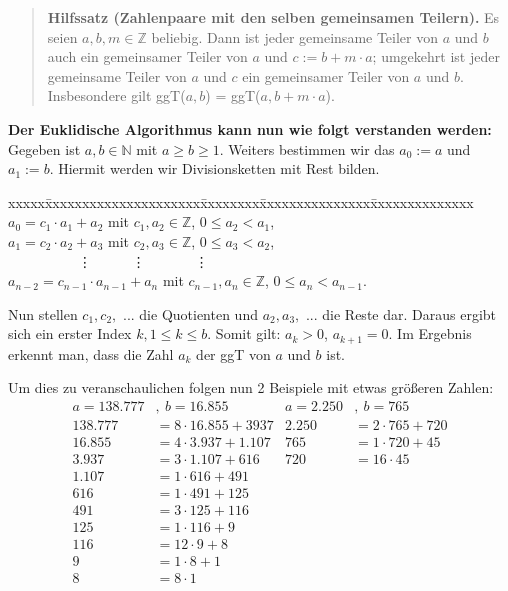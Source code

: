 \documentclass[german,12pt,a4paper]{article}
\begin{document}
\begin{quote}
\small
\textbf{Hilfssatz (Zahlenpaare mit den selben gemeinsamen Teilern).}
Es seien $a, b, m \in \mathbb{Z}$ beliebig. Dann ist jeder gemeinsame Teiler von $a$ und $b$ auch ein gemeinsamer Teiler von $a$ und $c := b + m \cdot a$; umgekehrt ist jeder gemeinsame Teiler von $a$ und $c$ ein gemeinsamer Teiler von $a$ und $b$.
Insbesondere gilt ggT($a, b$) = ggT($a, b + m \cdot a$).\newline
\autocite[17]{RempeGillen2009}\newpage
\end{quote}
\textbf{Der Euklidische Algorithmus kann nun wie folgt verstanden werden:}\newline
Gegeben ist $a, b \in \mathbb{N}$ mit $a \ge b \ge 1$.
Weiters bestimmen wir das $a_0 := a$ und $a_1 := b$.
Hiermit werden wir Divisionsketten mit Rest bilden.
\begin{tabbing}
xxxxx\=xxxxxxxxxxxxxxxxxxxxx\=xxxxxxxx\=xxxxxxxxxxxxxxx\=xxxxxxxxxxxxxx\kill
\> $a_0 = c_1 \cdot a_1 + a_2$             \> mit \> $c_1, a_2 \in \mathbb{Z}$,     \> $0 \le a_2 < a_1$,  \\
\> $a_1 = c_2 \cdot a_2 + a_3$             \> mit \> $c_2, a_3 \in \mathbb{Z}$,     \> $0 \le a_3 < a_2$,  \\
\> \ \ \ \ \ \ \ \ \ \ \vdots              \>     \>\ \ \ \ \ \vdots                \>\ \ \ \ \ \ \ \vdots \\
\> $a_{n-2} = c_{n-1} \cdot a_{n-1} + a_n$ \> mit \> $c_{n-1}, a_n \in \mathbb{Z}$, \> $0 \le a_n < a_{n-1}$.
\end{tabbing}
Nun stellen $c_1, c_2,$ ... die Quotienten und $a_2, a_3,$ ... die Reste dar. Daraus ergibt sich ein erster Index $k, 1 \le k \le b$.
Somit gilt: $a_k > 0$, $a_{k+1} = 0$.\newline
Im Ergebnis erkennt man, dass die Zahl $a_k$ der ggT von $a$ und $b$ ist.

Um dies zu veranschaulichen folgen nun 2 Beispiele mit etwas größeren Zahlen:
\begin{align}
a = 138.777 &,\ b = 16.855       & a = 2.250 &,\ b = 765 \\
138.777 &= 8 \cdot 16.855 + 3937 & 2.250 &= 2 \cdot 765 + 720 \\
16.855  &= 4 \cdot 3.937 + 1.107 & 765   &= 1 \cdot 720 + 45 \\
3.937   &= 3 \cdot 1.107 + 616   & 720   &= 16 \cdot 45 \\
1.107   &= 1 \cdot 616 + 491     &  \\
616     &= 1 \cdot 491 + 125     &  \\
491     &= 3 \cdot 125 + 116     &  \\
125     &= 1 \cdot 116 + 9       &  \\
116     &= 12 \cdot 9 + 8        &  \\
9       &= 1 \cdot 8 + 1         &  \\
8       &= 8 \cdot 1
\end{align}
\end{document}
